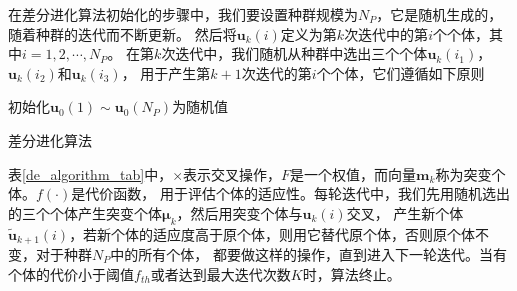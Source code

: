 \documentclass[master]{thesis-uestc}
\begin{document}
在差分进化算法初始化的步骤中，我们要设置种群规模为$N_P$，它是随机生成的，随着种群的迭代而不断更新。
然后将$\bm{u}_k(i)$定义为第$k$次迭代中的第$i$个个体，其中$i=1,2,\cdots,N_P$。
在第$k$次迭代中，我们随机从种群中选出三个个体$\bm{u}_k(i_1)$，$\bm{u}_k(i_2)$和$\bm{u}_k(i_3)$，
用于产生第$k+1$次迭代的第$i$个个体，它们遵循如下原则
\begin{algorithm}[H]
    初始化$\bm{u}_0(1)\sim\bm{u}_0(N_P)$为随机值\;
    \caption{差分进化算法}
    \label{de_algorithm_tab}
\end{algorithm}
表\ref{de_algorithm_tab}中，$\times$表示交叉操作，$F$是一个权值，而向量$\bm{m}_k$称为突变个体。$f(\cdot)$是代价函数，
用于评估个体的适应性。每轮迭代中，我们先用随机选出的三个个体产生突变个体$\bm{\mu}_k$，然后用突变个体与$\bm{u}_k(i)$交叉，
产生新个体$\tilde{\bm{u}}_{k+1}(i)$，若新个体的适应度高于原个体，则用它替代原个体，否则原个体不变，对于种群$N_P$中的所有个体，
都要做这样的操作，直到进入下一轮迭代。当有个体的代价小于阈值$f_{th}$或者达到最大迭代次数$K$时，算法终止。
\end{document}
